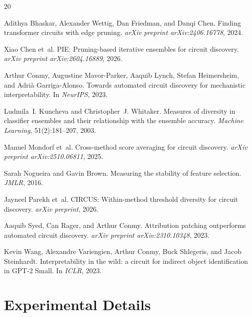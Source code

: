 \documentclass[11pt,a4paper]{article}
\begin{document}
\begin{thebibliography}{20}

Adithya Bhaskar, Alexander Wettig, Dan Friedman, and Danqi Chen.
\newblock Finding transformer circuits with edge pruning.
\newblock \emph{arXiv preprint arXiv:2406.16778}, 2024.

Xiao Chen et~al.
\newblock PIE: Pruning-based iterative ensembles for circuit discovery.
\newblock \emph{arXiv preprint arXiv:2604.16889}, 2026.

Arthur Conmy, Augustine Mavor-Parker, Aaquib Lynch, Stefan Heimersheim, and Adri\`{a} Garriga-Alonso.
\newblock Towards automated circuit discovery for mechanistic interpretability.
\newblock In \emph{NeurIPS}, 2023.

Ludmila~I. Kuncheva and Christopher~J. Whitaker.
\newblock Measures of diversity in classifier ensembles and their relationship with the ensemble accuracy.
\newblock \emph{Machine Learning}, 51(2):181--207, 2003.

Manuel Mondorf et~al.
\newblock Cross-method score averaging for circuit discovery.
\newblock \emph{arXiv preprint arXiv:2510.06811}, 2025.

Sarah Nogueira and Gavin Brown.
\newblock Measuring the stability of feature selection.
\newblock \emph{JMLR}, 2016.

Jayneel Parekh et~al.
\newblock CIRCUS: Within-method threshold diversity for circuit discovery.
\newblock \emph{arXiv preprint}, 2026.

Aaquib Syed, Can Rager, and Arthur Conmy.
\newblock Attribution patching outperforms automated circuit discovery.
\newblock \emph{arXiv preprint arXiv:2310.10348}, 2023.

Kevin Wang, Alexandre Variengien, Arthur Conmy, Buck Shlegeris, and Jacob Steinhardt.
\newblock Interpretability in the wild: a circuit for indirect object identification in GPT-2 Small.
\newblock In \emph{ICLR}, 2023.

\end{thebibliography}

\appendix
\section{Experimental Details}
\label{app:details}
\end{document}
